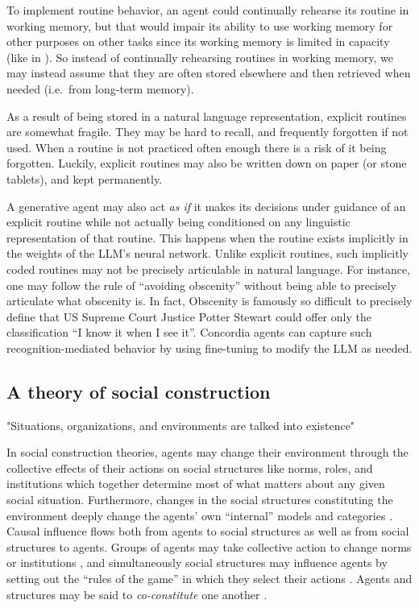 \documentclass[11pt, a4paper, logo, twocolumn, internal, copyright, numbering]{googledeepmind}
\begin{document}
To implement routine behavior, an agent could continually rehearse its routine in working memory, but that would impair its ability to use working memory for other purposes on other tasks since its working memory is limited in capacity (like in \cite{baddeley1992working}). So instead of continually rehearsing routines in working memory, we may instead assume that they are often stored elsewhere and then retrieved when needed (i.e.~from long-term memory).

As a result of being stored in a natural language representation, explicit routines are somewhat fragile. They may be hard to recall, and frequently forgotten if not used. When a routine is not practiced often enough there is a risk of it being forgotten. Luckily, explicit routines may also be written down on paper (or stone tablets), and kept permanently.

A generative agent may also act \textit{as if} it makes its decisions under guidance of an explicit routine while not actually being conditioned on any linguistic representation of that routine. This happens when the routine exists implicitly in the weights of the LLM's neural network. Unlike explicit routines, such implicitly coded routines may not be precisely articulable in natural language. For instance, one may follow the rule of ``avoiding obscenity'' without being able to precisely articulate what obscenity is. In fact, Obscenity is famously so difficult to precisely define that US Supreme Court Justice Potter Stewart could offer only the classification ``I know it when I see it''. Concordia agents can capture such recognition-mediated behavior by using fine-tuning to modify the LLM as needed.



\subsection{A theory of social construction}
\epigraph{ "Situations, organizations, and environments are talked into existence"}{\cite{weick2005sensemaking}}

In social construction theories, agents may change their environment through the collective effects of their actions on social structures like norms, roles, and institutions which together determine most of what matters about any given social situation. Furthermore, changes in the social structures constituting the environment deeply change the agents' own ``internal'' models and categories \citep{wendt1992anarchy}. Causal influence flows both from agents to social structures as well as from social structures to agents. Groups of agents may take collective action to change norms or institutions \citep{sunstein2019change}, and simultaneously social structures may influence agents by setting out the ``rules of the game'' in which they select their actions \citep{wendt1987agent}. Agents and structures may be said to \textit{co-constitute} one another \citep{onuf1989world}.
\end{document}
